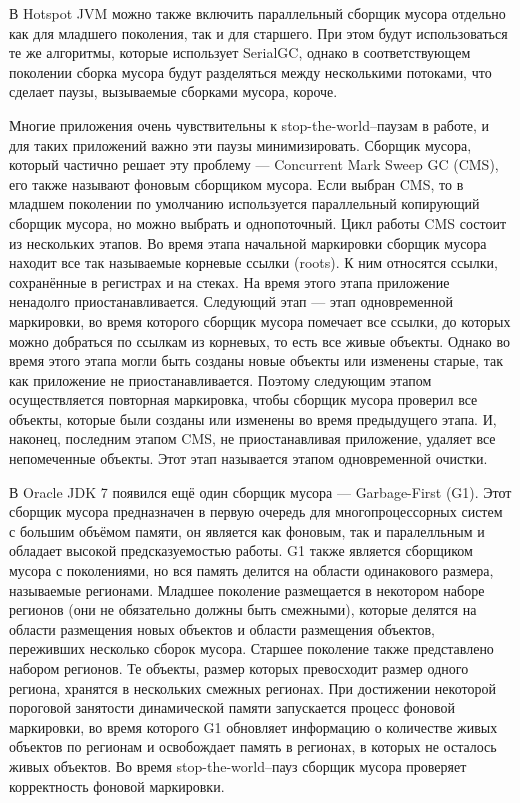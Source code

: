 В Hotspot JVM можно также включить параллельный сборщик мусора отдельно как для младшего поколения, 
так и для старшего. При этом будут использоваться те же алгоритмы, которые
использует SerialGC, однако в соответствующем поколении сборка мусора будут разделяться между несколькими 
потоками, что сделает паузы, вызываемые сборками мусора, короче.

Многие приложения очень чувствительны к stop-the-world--паузам в работе, и для таких приложений
важно эти паузы минимизировать. Сборщик мусора, который частично решает эту проблему ---
Concurrent Mark Sweep GC (CMS), его также называют фоновым сборщиком мусора.
Если выбран CMS, то в младшем поколении по умолчанию используется параллельный копирующий
сборщик мусора, но можно выбрать и однопоточный. Цикл работы CMS состоит из нескольких этапов.
Во время этапа начальной маркировки сборщик мусора находит все так называемые 
корневые ссылки (roots). К ним относятся ссылки, сохранённые в регистрах и на стеках. На время
этого этапа приложение ненадолго приостанавливается. Следующий этап --- этап одновременной
маркировки, во время которого сборщик мусора помечает все ссылки, до которых 
можно добраться по ссылкам из корневых, то есть все живые объекты. Однако
во время этого этапа могли быть созданы новые объекты или изменены старые, так как приложение
не приостанавливается. Поэтому следующим этапом осуществляется повторная маркировка, чтобы
сборщик мусора проверил все объекты, которые были созданы или изменены во время предыдущего
этапа. И, наконец, последним этапом CMS, не приостанавливая приложение, удаляет все
непомеченные объекты. Этот этап называется этапом одновременной очистки.

В Oracle JDK 7 появился ещё один сборщик мусора --- Garbage-First (G1). Этот сборщик 
мусора предназначен в первую очередь для многопроцессорных систем с большим объёмом памяти,
он является как фоновым, так и паралелльным и обладает высокой предсказуемостью работы.
G1 также является сборщиком мусора с поколениями, но вся память делится на области 
одинакового размера, называемые регионами. Младшее поколение размещается в некотором
наборе регионов (они не обязательно должны быть смежными), которые делятся на области размещения новых
объектов и области размещения объектов, переживших несколько сборок мусора. 
Старшее поколение также представлено набором регионов. Те объекты,
размер которых превосходит размер одного региона, хранятся в нескольких смежных регионах.
При достижении некоторой пороговой занятости динамической памяти запускается процесс
фоновой маркировки, во время которого G1 обновляет информацию о количестве живых объектов
по регионам и освобождает память в регионах, в которых не осталось живых объектов. Во
время stop-the-world--пауз сборщик мусора проверяет корректность фоновой маркировки.

